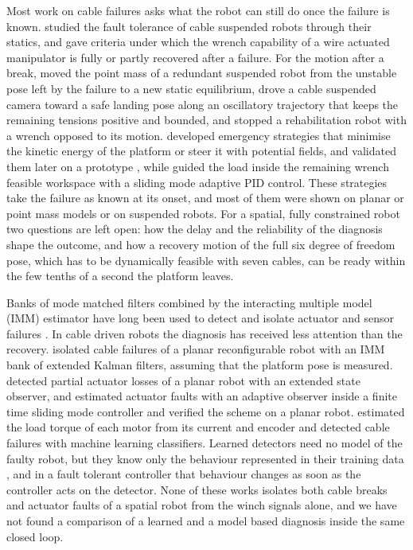 \documentclass[a4paper,fleqn]{cas-dc}
\begin{document}
Most work on cable failures asks what the robot can still do once the failure is known. \citet{roberts1998fault} studied the fault tolerance of cable suspended robots through their statics, and \citet{notash2012failure} gave criteria under which the wrench capability of a wire actuated manipulator is fully or partly recovered after a failure. For the motion after a break, \citet{berti2016recovery} moved the point mass of a redundant suspended robot from the unstable pose left by the failure to a new static equilibrium, \citet{passarini2019camera} drove a cable suspended camera toward a safe landing pose along an oscillatory trajectory that keeps the remaining tensions positive and bounded, and \citet{boschetti2019rehab} stopped a rehabilitation robot with a wrench opposed to its motion. \citet{boumann2019emergency} developed emergency strategies that minimise the kinetic energy of the platform or steer it with potential fields, and validated them later on a prototype \citep{boumann2023validation}, while \citet{dipaola2024smapid} guided the load inside the remaining wrench feasible workspace with a sliding mode adaptive PID control. These strategies take the failure as known at its onset, and most of them were shown on planar or point mass models or on suspended robots. For a spatial, fully constrained robot two questions are left open: how the delay and the reliability of the diagnosis shape the outcome, and how a recovery motion of the full six degree of freedom pose, which has to be dynamically feasible with seven cables, can be ready within the few tenths of a second the platform leaves.

Banks of mode matched filters combined by the interacting multiple model (IMM) estimator \citep{blom1988imm} have long been used to detect and isolate actuator and sensor failures \citep{zhang1998imm,zhang2008review}. In cable driven robots the diagnosis has received less attention than the recovery. \citet{raman2023cable} isolated cable failures of a planar reconfigurable robot with an IMM bank of extended Kalman filters, assuming that the platform pose is measured. \citet{majdi2023smc} detected partial actuator losses of a planar robot with an extended state observer, and \citet{fazeli2023active} estimated actuator faults with an adaptive observer inside a finite time sliding mode controller and verified the scheme on a planar robot. \citet{bettega2025load} estimated the load torque of each motor from its current and encoder and detected cable failures with machine learning classifiers. Learned detectors need no model of the faulty robot, but they know only the behaviour represented in their training data \citep{khalastchi2018survey}, and in a fault tolerant controller that behaviour changes as soon as the controller acts on the detector. None of these works isolates both cable breaks and actuator faults of a spatial robot from the winch signals alone, and we have not found a comparison of a learned and a model based diagnosis inside the same closed loop.
\end{document}
